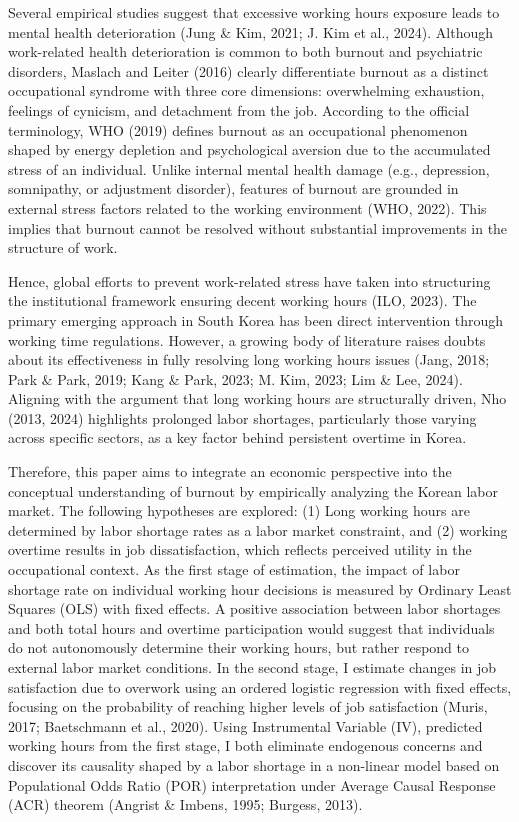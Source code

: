 \documentclass[
  12pt,
]{article}
\begin{document}
Several empirical studies suggest that excessive working hours exposure
leads to mental health deterioration (Jung \& Kim, 2021; J. Kim et al.,
2024). Although work-related health deterioration is common to both
burnout and psychiatric disorders, Maslach and Leiter (2016) clearly
differentiate burnout as a distinct occupational syndrome with three
core dimensions: overwhelming exhaustion, feelings of cynicism, and
detachment from the job. According to the official terminology, WHO
(2019) defines burnout as an occupational phenomenon shaped by energy
depletion and psychological aversion due to the accumulated stress of an
individual. Unlike internal mental health damage (e.g., depression,
somnipathy, or adjustment disorder), features of burnout are grounded in
external stress factors related to the working environment (WHO, 2022).
This implies that burnout cannot be resolved without substantial
improvements in the structure of work.

Hence, global efforts to prevent work-related stress have taken into
structuring the institutional framework ensuring decent working hours
(ILO, 2023). The primary emerging approach in South Korea has been
direct intervention through working time regulations. However, a growing
body of literature raises doubts about its effectiveness in fully
resolving long working hours issues (Jang, 2018; Park \& Park, 2019;
Kang \& Park, 2023; M. Kim, 2023; Lim \& Lee, 2024). Aligning with the
argument that long working hours are structurally driven, Nho (2013,
2024) highlights prolonged labor shortages, particularly those varying
across specific sectors, as a key factor behind persistent overtime in
Korea.

Therefore, this paper aims to integrate an economic perspective into the
conceptual understanding of burnout by empirically analyzing the Korean
labor market. The following hypotheses are explored: (1) Long working
hours are determined by labor shortage rates as a labor market
constraint, and (2) working overtime results in job dissatisfaction,
which reflects perceived utility in the occupational context. As the
first stage of estimation, the impact of labor shortage rate on
individual working hour decisions is measured by Ordinary Least Squares
(OLS) with fixed effects. A positive association between labor shortages
and both total hours and overtime participation would suggest that
individuals do not autonomously determine their working hours, but
rather respond to external labor market conditions. In the second stage,
I estimate changes in job satisfaction due to overwork using an ordered
logistic regression with fixed effects, focusing on the probability of
reaching higher levels of job satisfaction (Muris, 2017; Baetschmann et
al., 2020). Using Instrumental Variable (IV), predicted working hours
from the first stage, I both eliminate endogenous concerns and discover
its causality shaped by a labor shortage in a non-linear model based on
Populational Odds Ratio (POR) interpretation under Average Causal
Response (ACR) theorem (Angrist \& Imbens, 1995; Burgess, 2013).
\end{document}

